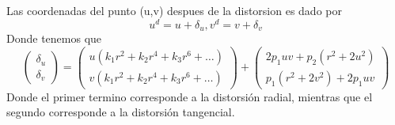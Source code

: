 Las coordenadas del punto (u,v) despues de la distorsion es dado por
\begin{equation}
	u^d = u + \delta_u, v^d = v+\delta_v
\end{equation}
Donde tenemos que
\begin{equation}
	\left(
	\begin{array}{c}
			\delta_u \\
			\delta_v
		\end{array}
	\right)
	=
	\left(
	\begin{array}{c}
			u(k_1r^2 + k_2r^4 + k_3r^6 + \dots) \\
			v(k_1r^2 + k_2r^4 + k_3r^6 + \dots)
		\end{array}
	\right)
	+ 
	\left(
		\begin{array}{c}
			2p_1uv + p_2(r^2+2u^2)\\
			p_1(r^2+2v^2) + 2p_1uv			
		\end{array}
	\right)
\end{equation}
Donde el primer termino corresponde a la distorsión radial, mientras que el segundo corresponde a la distorsión tangencial.

